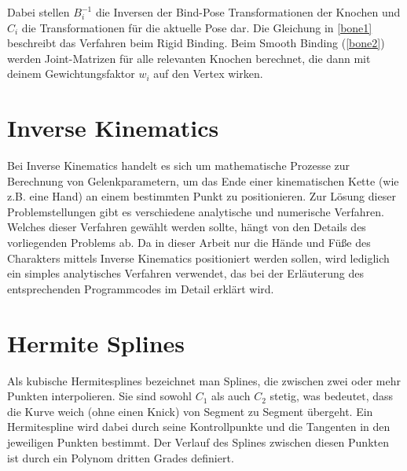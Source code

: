 Dabei stellen $B_{i}^{-1}$ die Inversen der Bind-Pose Transformationen der Knochen und $C_{i}$ die Transformationen für die aktuelle Pose dar. Die Gleichung in \ref{bone1} beschreibt das Verfahren beim Rigid Binding. Beim Smooth Binding (\ref{bone2}) werden Joint-Matrizen für alle relevanten Knochen berechnet, die dann mit deinem Gewichtungsfaktor $w_{i}$ auf den Vertex wirken.

\section{Inverse Kinematics}
Bei Inverse Kinematics handelt es sich um mathematische Prozesse zur Berechnung von Gelenkparametern, um das Ende einer kinematischen Kette (wie z.B. eine Hand) an einem bestimmten Punkt zu positionieren. Zur Lösung dieser Problemstellungen gibt es verschiedene analytische und numerische Verfahren. Welches dieser Verfahren gewählt werden sollte, hängt von den Details des vorliegenden Problems ab. Da in dieser Arbeit nur die Hände und Füße des Charakters mittels Inverse Kinematics positioniert werden sollen, wird lediglich ein simples analytisches Verfahren verwendet, das bei der Erläuterung des entsprechenden Programmcodes im Detail erklärt wird.

\section{Hermite Splines}
Als kubische Hermitesplines bezeichnet man Splines, die zwischen zwei oder mehr Punkten interpolieren. Sie sind sowohl $C_1$ als auch $C_2$ stetig, was bedeutet, dass die Kurve weich (ohne einen Knick) von Segment zu Segment übergeht. Ein Hermitespline wird dabei durch seine Kontrollpunkte und die Tangenten in den jeweiligen Punkten bestimmt. Der Verlauf des Splines zwischen diesen Punkten ist durch ein Polynom dritten Grades definiert.